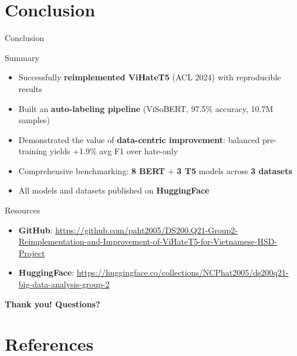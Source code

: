\documentclass[10pt, aspectratio=169]{beamer}
\begin{document}
\section{Conclusion}

\begin{frame}[shrink=8]{Conclusion}
  \begin{block}{Summary}
    \begin{itemize}
      \item Successfully \textbf{reimplemented ViHateT5} (ACL 2024) with reproducible results
      \item Built an \textbf{auto-labeling pipeline} (ViSoBERT, 97.5\% accuracy, 10.7M samples)
      \item Demonstrated the value of \textbf{data-centric improvement}: balanced pre-training yields +1.9\% avg F1 over hate-only
      \item Comprehensive benchmarking: \textbf{8 BERT} + \textbf{3 T5} models across \textbf{3 datasets}
      \item All models and datasets published on \textbf{HuggingFace}
    \end{itemize}
  \end{block}
  \vspace{0.3cm}

  \begin{exampleblock}{Resources}
    \begin{itemize}
      \item \textbf{GitHub}: \url{https://github.com/paht2005/DS200.Q21-Group2-Reimplementation-and-Improvement-of-ViHateT5-for-Vietnamese-HSD-Project}
      \item \textbf{HuggingFace}: \url{https://huggingface.co/collections/NCPhat2005/ds200q21-big-data-analysis-group-2}
    \end{itemize}
  \end{exampleblock}

  \vspace{0.3cm}
  \begin{center}
    {\Large\bfseries\color{uitblue} Thank you! Questions?}
  \end{center}
\end{frame}

\section{References}
\end{document}
